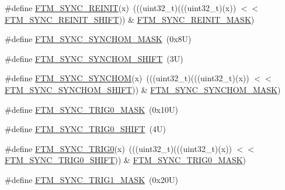 \begin{DoxyCompactItemize}
\item 
\#define \mbox{\hyperlink{group___f_t_m___register___masks_ga5b5c2815a448f95eb9e106ba2dc0299c}{F\+T\+M\+\_\+\+S\+Y\+N\+C\+\_\+\+R\+E\+I\+N\+IT}}(x)~(((uint32\+\_\+t)(((uint32\+\_\+t)(x)) $<$$<$ \mbox{\hyperlink{group___f_t_m___register___masks_gaf3a51fedf11a10a6793f9df11ca77e87}{F\+T\+M\+\_\+\+S\+Y\+N\+C\+\_\+\+R\+E\+I\+N\+I\+T\+\_\+\+S\+H\+I\+FT}})) \& \mbox{\hyperlink{group___f_t_m___register___masks_gafae9d365874a8b4adc13ccc1a3873b6a}{F\+T\+M\+\_\+\+S\+Y\+N\+C\+\_\+\+R\+E\+I\+N\+I\+T\+\_\+\+M\+A\+SK}})
\item 
\#define \mbox{\hyperlink{group___f_t_m___register___masks_ga1393ccaf9753328f3b3b65cf28f6804f}{F\+T\+M\+\_\+\+S\+Y\+N\+C\+\_\+\+S\+Y\+N\+C\+H\+O\+M\+\_\+\+M\+A\+SK}}~(0x8\+U)
\item 
\#define \mbox{\hyperlink{group___f_t_m___register___masks_ga9f4fbe85603aa455463585444e27dbb3}{F\+T\+M\+\_\+\+S\+Y\+N\+C\+\_\+\+S\+Y\+N\+C\+H\+O\+M\+\_\+\+S\+H\+I\+FT}}~(3\+U)
\item 
\#define \mbox{\hyperlink{group___f_t_m___register___masks_ga5ec19a767e48d01dafd69822b4d0c38a}{F\+T\+M\+\_\+\+S\+Y\+N\+C\+\_\+\+S\+Y\+N\+C\+H\+OM}}(x)~(((uint32\+\_\+t)(((uint32\+\_\+t)(x)) $<$$<$ \mbox{\hyperlink{group___f_t_m___register___masks_ga9f4fbe85603aa455463585444e27dbb3}{F\+T\+M\+\_\+\+S\+Y\+N\+C\+\_\+\+S\+Y\+N\+C\+H\+O\+M\+\_\+\+S\+H\+I\+FT}})) \& \mbox{\hyperlink{group___f_t_m___register___masks_ga1393ccaf9753328f3b3b65cf28f6804f}{F\+T\+M\+\_\+\+S\+Y\+N\+C\+\_\+\+S\+Y\+N\+C\+H\+O\+M\+\_\+\+M\+A\+SK}})
\item 
\#define \mbox{\hyperlink{group___f_t_m___register___masks_ga5ee32a648ec1a88f07ea32b9a680684b}{F\+T\+M\+\_\+\+S\+Y\+N\+C\+\_\+\+T\+R\+I\+G0\+\_\+\+M\+A\+SK}}~(0x10\+U)
\item 
\#define \mbox{\hyperlink{group___f_t_m___register___masks_ga1b676aad473928dd52e5d757149ab445}{F\+T\+M\+\_\+\+S\+Y\+N\+C\+\_\+\+T\+R\+I\+G0\+\_\+\+S\+H\+I\+FT}}~(4\+U)
\item 
\#define \mbox{\hyperlink{group___f_t_m___register___masks_gab555153ce967562e8b70bca372deef32}{F\+T\+M\+\_\+\+S\+Y\+N\+C\+\_\+\+T\+R\+I\+G0}}(x)~(((uint32\+\_\+t)(((uint32\+\_\+t)(x)) $<$$<$ \mbox{\hyperlink{group___f_t_m___register___masks_ga1b676aad473928dd52e5d757149ab445}{F\+T\+M\+\_\+\+S\+Y\+N\+C\+\_\+\+T\+R\+I\+G0\+\_\+\+S\+H\+I\+FT}})) \& \mbox{\hyperlink{group___f_t_m___register___masks_ga5ee32a648ec1a88f07ea32b9a680684b}{F\+T\+M\+\_\+\+S\+Y\+N\+C\+\_\+\+T\+R\+I\+G0\+\_\+\+M\+A\+SK}})
\item 
\#define \mbox{\hyperlink{group___f_t_m___register___masks_gab2caa82ba7f028e7a696a8e02b7f87ac}{F\+T\+M\+\_\+\+S\+Y\+N\+C\+\_\+\+T\+R\+I\+G1\+\_\+\+M\+A\+SK}}~(0x20\+U)
$$
\end{DoxyCompactItemize}
